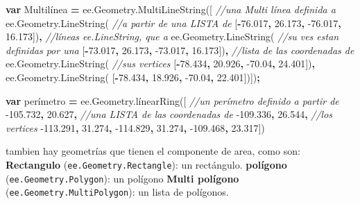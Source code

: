 \documentclass[
]{article}
\newenvironment{Shaded}{\begin{snugshade}}{\end{snugshade}}
\newcommand{\AttributeTok}[1]{\textcolor[rgb]{0.77,0.63,0.00}{#1}}
\newcommand{\CommentTok}[1]{\textcolor[rgb]{0.56,0.35,0.01}{\textit{#1}}}
\newcommand{\FloatTok}[1]{\textcolor[rgb]{0.00,0.00,0.81}{#1}}
\newcommand{\KeywordTok}[1]{\textcolor[rgb]{0.13,0.29,0.53}{\textbf{#1}}}
\newcommand{\NormalTok}[1]{#1}
\newcommand{\OperatorTok}[1]{\textcolor[rgb]{0.81,0.36,0.00}{\textbf{#1}}}
\newcommand{\VariableTok}[1]{\textcolor[rgb]{0.00,0.00,0.00}{#1}}
\begin{document}
\begin{Shaded}
\begin{Highlighting}[]
\KeywordTok{var}\NormalTok{ Multilínea }\OperatorTok{=} \VariableTok{ee}\NormalTok{.}\VariableTok{Geometry}\NormalTok{.}\AttributeTok{MultiLineString}\NormalTok{([  }\CommentTok{//una Multi línea definida a}
   \VariableTok{ee}\NormalTok{.}\VariableTok{Geometry}\NormalTok{.}\AttributeTok{LineString}\NormalTok{(                      }\CommentTok{//a partir de una LISTA de}
\NormalTok{     [}\OperatorTok{-}\FloatTok{76.017}\OperatorTok{,} \FloatTok{26.173}\OperatorTok{,} \FloatTok{-76.017}\OperatorTok{,} \FloatTok{16.173}\NormalTok{])}\OperatorTok{,}       \CommentTok{//líneas ee.LineString, que a}
  \VariableTok{ee}\NormalTok{.}\VariableTok{Geometry}\NormalTok{.}\AttributeTok{LineString}\NormalTok{(                       }\CommentTok{//su ves estan definidas por una}
\NormalTok{    [}\OperatorTok{-}\FloatTok{73.017}\OperatorTok{,} \FloatTok{26.173}\OperatorTok{,} \FloatTok{-73.017}\OperatorTok{,} \FloatTok{16.173}\NormalTok{])}\OperatorTok{,}        \CommentTok{//lista de las coordenadas de}
  \VariableTok{ee}\NormalTok{.}\VariableTok{Geometry}\NormalTok{.}\AttributeTok{LineString}\NormalTok{(                       }\CommentTok{//sus vertices}
\NormalTok{    [}\OperatorTok{-}\FloatTok{78.434}\OperatorTok{,} \FloatTok{20.926}\OperatorTok{,} \FloatTok{-70.04}\OperatorTok{,} \FloatTok{24.401}\NormalTok{])}\OperatorTok{,}
  \VariableTok{ee}\NormalTok{.}\VariableTok{Geometry}\NormalTok{.}\AttributeTok{LineString}\NormalTok{(}
\NormalTok{    [}\OperatorTok{-}\FloatTok{78.434}\OperatorTok{,} \FloatTok{18.926}\OperatorTok{,} \FloatTok{-70.04}\OperatorTok{,} \FloatTok{22.401}\NormalTok{])])}\OperatorTok{;}

\KeywordTok{var}\NormalTok{ perímetro }\OperatorTok{=} \VariableTok{ee}\NormalTok{.}\VariableTok{Geometry}\NormalTok{.}\AttributeTok{línearRing}\NormalTok{([  }\CommentTok{//un perímetro definido a partir de}
  \FloatTok{-105.732}\OperatorTok{,} \FloatTok{20.627}\OperatorTok{,}                       \CommentTok{//una LISTA  de las coordenadas de}
  \FloatTok{-109.336}\OperatorTok{,} \FloatTok{26.544}\OperatorTok{,}                       \CommentTok{//los vertices}
  \FloatTok{-113.291}\OperatorTok{,} \FloatTok{31.274}\OperatorTok{,}
  \FloatTok{-114.829}\OperatorTok{,} \FloatTok{31.274}\OperatorTok{,}
  \FloatTok{-109.468}\OperatorTok{,} \FloatTok{23.317}\NormalTok{])}
\end{Highlighting}
\end{Shaded}

tambien hay geometrías que tienen el componente de area, como son:
\textbf{Rectangulo} (\texttt{ee.Geometry.Rectangle}): un rectángulo.
\textbf{polígono} (\texttt{ee.Geometry.Polygon}): un polígono
\textbf{Multi polígono} (\texttt{ee.Geometry.MultiPolygon}): un lista de
polígonos.
\end{document}
